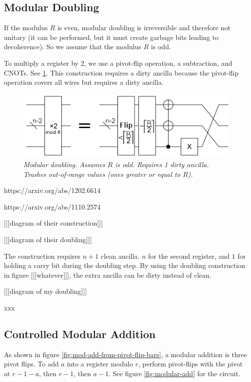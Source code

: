 \documentclass[twocolumn]{article}
\begin{document}
\subsection{Modular Doubling}

If the modulus $R$ is even, modular doubling is irreversible and therefore not unitary (it can be performed, but it must create garbage bits leading to decoherence).
So we assume that the modulus $R$ is odd.

To multiply a register by 2, we use a pivot-flip operation, a subtraction, and CNOTs.
See \ref{fig:modular-double}.
This construction requires a dirty ancilla because the pivot-flip operation covers all wires but requires a dirty ancilla.

\begin{figure}
  \centering
  \includegraphics[width=\linewidth]{assets/modular-double.png}
  \caption{\em
    Modular doubling.
    Assumes $R$ is odd.
    Requires 1 dirty ancilla.
    Trashes out-of-range values (ones greater or equal to $R$).
  }
  \label{fig:modular-double}
\end{figure}

https://arxiv.org/abs/1202.6614

https://arxiv.org/abs/1110.2574


[[[diagram of their construction]]]

[[[diagram of their doubling]]]

The construction requires $n+1$ clean ancilla.
$n$ for the second register, and $1$ for holding a carry bit during the doubling step.
By using the doubling construction in figure [[[whatever]]], the extra ancilla can be dirty instead of clean.

[[[diagram of my doubling]]]

xxx

\subsection{Controlled Modular Addition}

As shown in figure \ref{fig:mod-add-from-pivot-flip-bars}, a modular addition is three pivot flips.
To add $a$ into a register modulo $r$, perform pivot-flips with the pivot at $r-1-a$, then $r-1$, then $a-1$.
See figure \ref{fig:modular-add} for the circuit.
\end{document}

